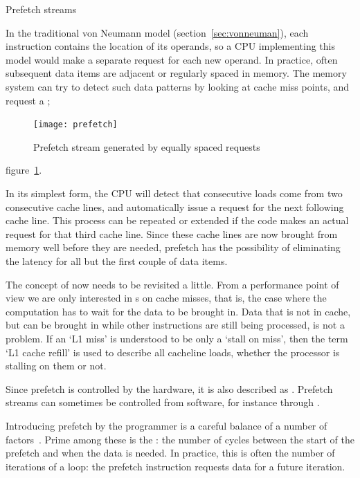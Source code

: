 {Prefetch streams}
\label{sec:prefetch}

In the traditional von Neumann model (section~\ref{sec:vonneuman}),
each instruction contains the location of its operands, so a \ac{CPU}
implementing this model would make a separate request for each new
operand. In practice, often subsequent data items are adjacent or
regularly spaced in memory. The memory system can try to detect such
data patterns by looking at cache miss points,
and request a ;
\begin{figure}
  \texttt{[image: prefetch]}
  \caption{Prefetch stream generated by equally spaced requests}
  \label{fig:prefetch}
\end{figure}
figure~\ref{fig:prefetch}.

In its simplest form, the \ac{CPU} will detect that consecutive loads come
from two consecutive cache lines, and automatically issue a request
for the next following cache line. This process can be repeated or
extended if the code makes an actual request for that third cache
line. Since these cache lines are now brought from memory well before
they are needed, prefetch has the possibility of eliminating the
latency for all but the first couple of data items.

The concept of  now needs to be revisited a
little. From a performance point of view we are only interested in
s on cache misses, that is, the case where the
computation has to wait for the data to be brought in. Data that is
not in cache, but can be brought in while other instructions are still
being processed, is not a problem. If an `L1 miss' is understood to be
only a `stall on miss', then the term `L1 cache refill' is used to
describe all cacheline loads, whether the processor is stalling on
them or not.

Since prefetch is controlled by the hardware, it is also described as
.
Prefetch streams can sometimes be
controlled from software, for instance through .

Introducing prefetch by the programmer is a careful balance of a
number of factors~\cite{Guttman:prefetchKNC}. Prime among these is the
: the number of cycles between the
start of the prefetch and when the data is needed. In practice, this
is often the number of iterations of a loop: the prefetch instruction
requests data for a future iteration.

